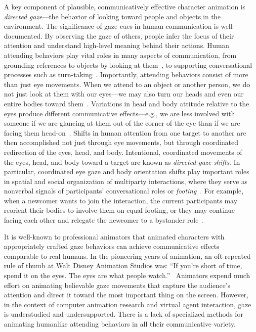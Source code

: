 A key component of plausible, communicatively effective character animation is \emph{directed gaze}---the behavior of looking toward people and objects in the environment.
The significance of gaze cues in human communication is well-documented. By observing the gaze of others, people infer the focus of their attention and understand high-level meaning behind their actions. Human attending behaviors play vital roles in many aspects of communication, from grounding references to objects by looking at them~\citep{hanna2007speakers,preissler2005role}, to supporting conversational processes such as turn-taking~\citep{wiemann1975turn}.
Importantly, attending behaviors consist of more than just eye movements. When we attend to an object or another person, we do not just look at them with our eyes---we may also turn our heads and even our entire bodies toward them~\citep{langton2000eyes}. Variations in head and body attitude relative to the eyes produce different communicative effects---e.g., we are less involved with someone if we are glancing at them out of the corner of the eye than if we are facing them head-on~\citep{kendon1990conducting,schegloff1998bodytorque}.
Shifts in human attention from one target to another are then accomplished not just through eye movements, but through coordinated redirection of the eyes, head, and body. Intentional, coordinated movements of the eyes, head, and body toward a target are known as \emph{directed gaze shifts}.
In particular, coordinated eye gaze and body orientation shifts play important roles in spatial and social organization of multiparty interactions, where they serve as nonverbal signals of participants' conversational roles or \emph{footing}~\citep{goffman1979footing}. For example, when a newcomer wants to join the interaction, the current participants may reorient their bodies to involve them on equal footing, or they may continue facing each other and relegate the newcomer to a bystander role~\citep{kendon1990conducting}.

It is well-known to professional animators that animated characters with appropriately crafted gaze behaviors can achieve communicative effects comparable to real humans. In the pioneering years of animation, an oft-repeated rule of thumb at Walt Disney Animation Studios was: ``If you're short of time, spend it on the eyes. The eyes are what people watch.''~\citep{williams2009animator} Animators expend much effort on animating believable gaze movements that capture the audience's attention and direct it toward the most important thing on the screen.
However, in the context of computer animation research and virtual agent interaction, gaze is understudied and undersupported. There is a lack of specialized methods for animating humanlike attending behaviors in all their communicative variety.

